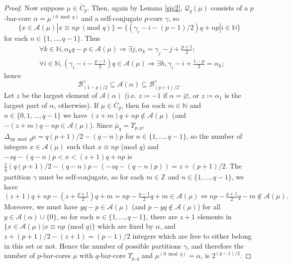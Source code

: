 \documentclass[ALCO, Unicode,published]{cedram}
\newcommand*\nicefrac[2]{#1/#2}
\begin{document}
\begin{proof}
Now suppose $\mu\in\overline{C}_p$. Then, again by Lemma \ref{sig2}, $\mathcal{Q}_q(\mu)$ consists of a $p$-bar-core $\alpha=\mu^{(0\bmod q)}$ and a self-conjugate $p$-core $\gamma$, so 
$$\{x\in\mathcal{A}(\mu)|x\equiv np\:(\text{mod }q)\}=\{(\gamma_i-i-\nicefrac{(p-1)}{2})q+np|i\in\mathbb{N}\}$$ for each $n\in\{1,\dots,q-1\}$. Thus 
\begin{align*}
&\forall k\in\mathbb{N},\alpha_kq-p\in\mathcal{A}(\mu)\Rightarrow\exists j,\alpha_k=\gamma_j-j+\tfrac{p+1}{2};\\
&\forall i\in\mathbb{N},(\gamma_i-i-\tfrac{p-1}{2})q\in\mathcal{A}(\mu)\Rightarrow\exists h,\gamma_i-i+\tfrac{1-p}{2}=\alpha_h; \end{align*}
hence 
$$\mathcal{B}^\gamma_{\nicefrac{(1-p)}{2}}\subseteq\mathcal{A}(\alpha)\subseteq\mathcal{B}^\gamma_{\nicefrac{(p+1)}{2}}.$$ 
Let $z$ be the largest element of $\mathcal{A}(\alpha)$ (i.e. $z\coloneqq-1$ if $\alpha=\varnothing$, or $z\coloneqq\alpha_1$ is the largest part of $\alpha$, otherwise). If $\mu\in\overline{C}_p$, then for each $m\in\mathbb{N}$ and $n\in\{0,1,\dots,q-1\}$ we have $(z+m)q+np\not\in\mathcal{A}(\mu)$ (and $-(z+m)q-np\in\mathcal{A}(\mu)$). Since $\overline{\mu}_q=\Upsilon_{p,q}$, $\Delta_{np\bmod q}\mu=\nicefrac{q(p+1)}{2}-(q-n)p$ for $n\in\{1,\dots,q-1\}$, so the number of integers $x\in\mathcal{A}(\mu)$ such that $x\equiv np$ (mod $q$) and $-zq-(q-n)p<x<(z+1)q+np$ is $\tfrac{1}{q}(\nicefrac{q(p+1)}{2}-(q-n)p-(-zq-(q-n)p))=z+\nicefrac{(p+1)}{2}$. 
The partition $\gamma$ must be self-conjugate, so for each $m\in\mathbb{Z}$ and $n\in\{1,\dots,q-1\}$, we have 
$$(z+1)q+np-(z+\tfrac{p+1}{2})q+m=np-\tfrac{p-1}{2}q+m\in\mathcal{A}(\mu)\Leftrightarrow np-\tfrac{p+1}{2}q-m\not\in\mathcal{A}(\mu).$$ 
Moreover, we must have $yq-p\in\mathcal{A}(\mu)$ (and $p-yq\not\in\mathcal{A}(\mu)$) for all $y\in\mathcal{A}(\alpha)\cup\{0\}$, so for each $n\in\{1,\dots,q-1\}$, there are $z+1$ elements in $\{x\in\mathcal{A}(\mu)|x\equiv np$ (mod $q)\}$ which are fixed by $\alpha$, and $z+\nicefrac{(p+1)}{2}-(z+1)=\nicefrac{(p-1)}{2}$ integers which are free to either belong in this set or not. Hence the number of possible partitions $\gamma$, and therefore the number of $p$-bar-cores $\mu$ with $q$-bar-core $\Upsilon_{p,q}$ and $\mu^{(0\bmod q)}=\alpha$, is $2^{\nicefrac{(p-1)}{2}}$. 

\smallskip


\end{proof}
\end{document}
